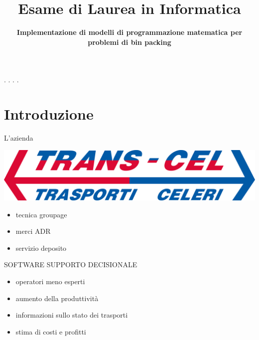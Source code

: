 \documentclass{beamer}
\title{\small{Esame di Laurea in Informatica}}
\subtitle{\textbf{\LARGE{Implementazione di modelli di programmazione matematica per problemi di bin packing}}}
\author[Daniel Rossi]{%
	\usebox{\authbox}
}
\institute{\footnotesize{Dipartimento di Matematica ''Tullio Levi Civita''}}
\date{%
	\usebox{\datebox}
}
\begin{document}
\maketitle
.
.
.
.

\section{Introduzione}

\begin{frame}{L'azienda}
	\begin{minipage}[c]{0.45\textwidth}
		\includegraphics[width=1\linewidth]{figures/logo-transcel}
	\end{minipage}
	\hfill
	\begin{minipage}[c]{0.45\textwidth}
		\begin{itemize}
			\item tecnica groupage
			\item merci ADR
			\item servizio deposito
		\end{itemize}
	\end{minipage}
			
	\vspace{3.0em}
	\large{\uppercase{Software supporto decisionale}}
	\begin{itemize}
		\item operatori meno esperti
		\item aumento della produttivit\`a
		\item informazioni sullo stato dei trasporti
		\item stima di costi e profitti
	\end{itemize}
\end{frame}
\end{document}
